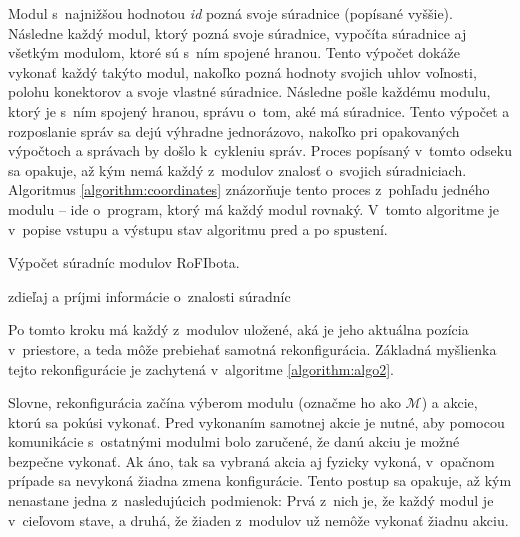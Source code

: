 \documentclass[
  printed, %
  oneside, %
  notable,   %
  nolof,     %
  nolot,     %
]{fithesis3}
\begin{document}
Modul s~najnižšou hodnotou \textit{id} pozná svoje súradnice (popísané vyššie). Následne každý modul, ktorý pozná svoje súradnice, vypočíta súradnice aj všetkým modulom, ktoré sú s~ním spojené hranou. Tento výpočet dokáže vykonať každý takýto modul, nakoľko pozná hodnoty svojich uhlov voľnosti, polohu konektorov a svoje vlastné súradnice. Následne pošle každému modulu, ktorý je s~ním spojený hranou, správu o~tom, aké má súradnice. Tento výpočet a rozposlanie správ sa dejú výhradne jednorázovo, nakoľko pri opakovaných výpočtoch a správach by došlo k~cykleniu správ. Proces popísaný v~tomto odseku sa opakuje, až kým nemá každý z~modulov znalosť o~svojich súradniciach. Algoritmus \ref{algorithm:coordinates} znázorňuje tento proces z~pohľadu jedného modulu -- ide o~program, ktorý má každý modul rovnaký. V~tomto algoritme je v~popise vstupu a výstupu stav algoritmu pred a po spustení. 

\begin{algorithm}
    \caption{Výpočet súradníc modulov RoFIbota. }
    \label{algorithm:coordinates}
    
    \DontPrintSemicolon
    
    zdieľaj a príjmi informácie o~znalosti súradníc\;
\end{algorithm}

Po tomto kroku má každý z~modulov uložené, aká je jeho aktuálna pozícia v~priestore, a teda môže prebiehať samotná rekonfigurácia. Základná myšlienka tejto rekonfigurácie je zachytená v~algoritme \ref{algorithm:algo2}. 

Slovne, rekonfigurácia začína výberom modulu (označme ho ako $\mathcal{M}$) a akcie, ktorú sa pokúsi vykonať. Pred vykonaním samotnej akcie je nutné, aby pomocou komunikácie s~ostatnými modulmi bolo zaručené, že danú akciu je možné bezpečne vykonať. Ak áno, tak sa vybraná akcia aj fyzicky vykoná, v~opačnom prípade sa nevykoná žiadna zmena konfigurácie. Tento postup sa opakuje, až kým nenastane jedna z~nasledujúcich podmienok: Prvá z~nich je, že každý modul je v~cieľovom stave, a druhá, že žiaden z~modulov už nemôže vykonať žiadnu akciu. 
\end{document}

